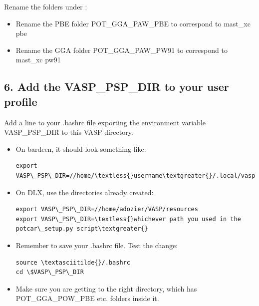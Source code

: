\documentclass[letterpaper,10pt,english]{sphinxmanual}
\begin{document}
Rename the folders under :
\begin{itemize}
\item {} 
Rename the PBE folder POT\_GGA\_PAW\_PBE to correspond to mast\_xc pbe

\item {} 
Rename the GGA folder POT\_GGA\_PAW\_PW91 to correspond to mast\_xc pw91

\end{itemize}


\subsection{6. Add the VASP\_PSP\_DIR to your user profile}
\label{1_0_installation:add-the-vasp-psp-dir-to-your-user-profile}
Add a line to your .bashrc file exporting the environment variable VASP\_PSP\_DIR to this VASP directory.
\begin{itemize}
\item {} 
On bardeen, it should look something like:

\begin{Verbatim}[commandchars=\\\{\}]
export VASP\_PSP\_DIR=//home/\textless{}username\textgreater{}/.local/vasp\_pps
\end{Verbatim}

\item {} 
On DLX, use the directories already created:

\begin{Verbatim}[commandchars=\\\{\}]
export VASP\_PSP\_DIR=//home/adozier/VASP/resources
export VASP\_PSP\_DIR=\textless{}whichever path you used in the potcar\_setup.py script\textgreater{}
\end{Verbatim}

\item {} 
Remember to save your .bashrc file. Test the change:

\begin{Verbatim}[commandchars=\\\{\}]
source \textasciitilde{}/.bashrc
cd \$VASP\_PSP\_DIR
\end{Verbatim}

\item {} 
Make sure you are getting to the right directory, which has POT\_GGA\_POW\_PBE etc. folders inside it.

\end{itemize}
\end{document}
